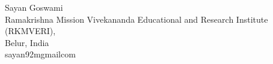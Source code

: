 \documentclass{aic}
\begin{document}
\begin{aicauthors}
\begin{authorinfo}[SG]
  Sayan Goswami\\
  Ramakrishna Mission Vivekananda Educational and Research Institute (RKMVERI), \\
  Belur, India\\
  sayan92m\imageat{}gmail\imagedot{}com \\
\end{authorinfo}
\end{aicauthors}
\end{document}
